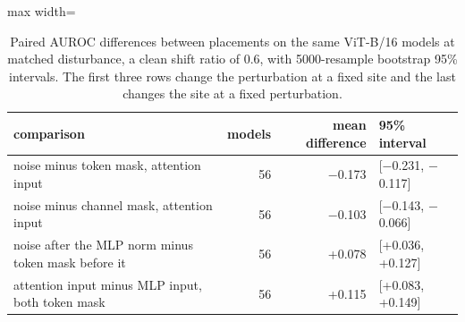 \begin{table}[htbp]
\centering
\small
\caption{Paired AUROC differences between placements on the same ViT-B/16 models at matched disturbance, a clean shift ratio of 0.6, with 5000-resample bootstrap 95\% intervals. The first three rows change the perturbation at a fixed site and the last changes the site at a fixed perturbation.}
\label{tab:operators-deltas}
\begin{adjustbox}{max width=\linewidth}
\begin{tabular}{lrrl}
\toprule
comparison & models & mean difference & 95\% interval \\
\midrule
noise minus token mask, attention input & 56 & $-$0.173 & [$-$0.231, $-$0.117] \\
noise minus channel mask, attention input & 56 & $-$0.103 & [$-$0.143, $-$0.066] \\
noise after the MLP norm minus token mask before it & 56 & +0.078 & [+0.036, +0.127] \\
attention input minus MLP input, both token mask & 56 & +0.115 & [+0.083, +0.149] \\
\bottomrule
\end{tabular}
\end{adjustbox}
\end{table}
